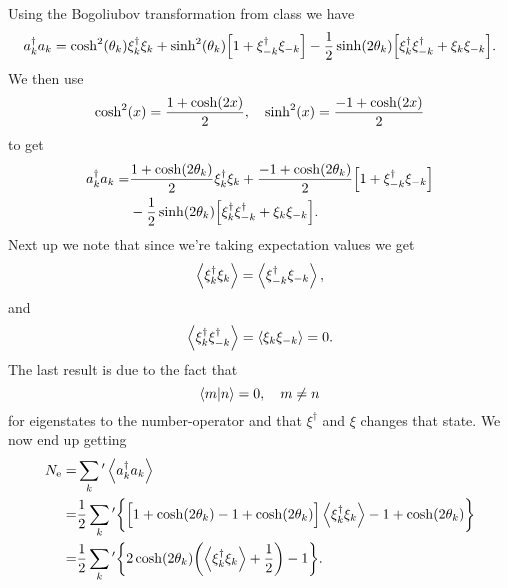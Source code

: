 \documentclass[11pt,letter, swedish, english
]{article}
\begin{document}
Using the Bogoliubov transformation from class we have
\begin{equation}
\begin{aligned}
a^\dagger_ka_k=\cosh^2(\theta_k) \xi^\dagger_k\xi_k 
+\sinh^2(\theta_k)\qty[1+\xi^\dagger_{-k}\xi_{-k} ]
-\frac{1}{2}\sinh(2\theta_k) 
\qty[\xi^\dagger_{k}\xi^\dagger_{-k}+\xi_{k}\xi_{-k}].
\end{aligned}
\end{equation}
We then use
\begin{equation}
\cosh^2(x)=\frac{1+\cosh(2x)}{2}\qcomma
\sinh^2(x)=\frac{-1+\cosh(2x)}{2}
\end{equation}
to get
\begin{equation}
\begin{aligned}
a^\dagger_ka_k=&\frac{1+\cosh(2\theta_k)}{2}\xi^\dagger_k\xi_k 
+\frac{-1+\cosh(2\theta_k)}{2}\qty[1+\xi^\dagger_{-k}\xi_{-k} ]\\
&-\frac{1}{2}\sinh(2\theta_k) 
\qty[\xi^\dagger_{k}\xi^\dagger_{-k}+\xi_{k}\xi_{-k}].
\end{aligned}
\end{equation}
Next up we note that since we're taking expectation values we get
\begin{equation}
\ev{\xi^\dagger_k\xi_k }=\ev{\xi^\dagger_{-k}\xi_{-k}},
\end{equation}
and
\begin{equation}
\ev{\xi^\dagger_{k}\xi^\dagger_{-k}}=\ev{\xi_{k}\xi_{-k}}=0.
\end{equation}
The last result is due to the fact that 
\begin{equation}
\ip{m}{n}=0\qcomma m\neq n
\end{equation}
for eigenstates to the number-operator and that $\xi^\dagger$ and $\xi$
changes that state. 
We now end up getting
\begin{equation}\label{eq:2_N_sum}
\begin{aligned}
\Ne=&\sum_k{'}\ev{a^\dagger_ka_k}\\
=&\frac{1}{2}
\sum_k{'}\bigg\{\Big[1+\cosh(2\theta_k) -1+\cosh(2\theta_k)\Big]
\ev{\xi^\dagger_k\xi_k }-1+\cosh(2\theta_k)\bigg\}\\
=&\frac{1}{2}\sum_k{'}\qty{
2\cosh(2\theta_k)\qty(\ev{\xi^\dagger_k\xi_k }+\frac{1}{2})-1
}.
\end{aligned}
\end{equation}
\end{document}

